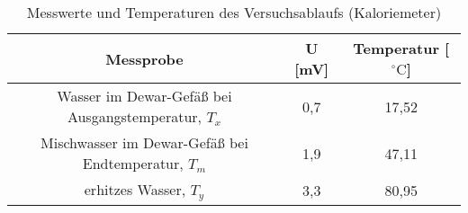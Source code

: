 \begin{table}[h]
	\begin{center}
		\begin{tabular}{ccc}
			Messprobe & U [mV] & Temperatur [$^{\circ}\mathrm{C}$]\\ \hline
			Wasser im Dewar-Gefäß bei Ausgangstemperatur, $T_x$& 0,7 & 17,52\\
			Mischwasser im Dewar-Gefäß bei Endtemperatur, $T_m$&1,9&47,11\\
			erhitzes Wasser, $T_y$&3,3&80,95
		\end{tabular}
		\caption{Messwerte und Temperaturen des Versuchsablaufs (Kaloriemeter)}
		\label{taba1}
	\end{center}
\end{table}